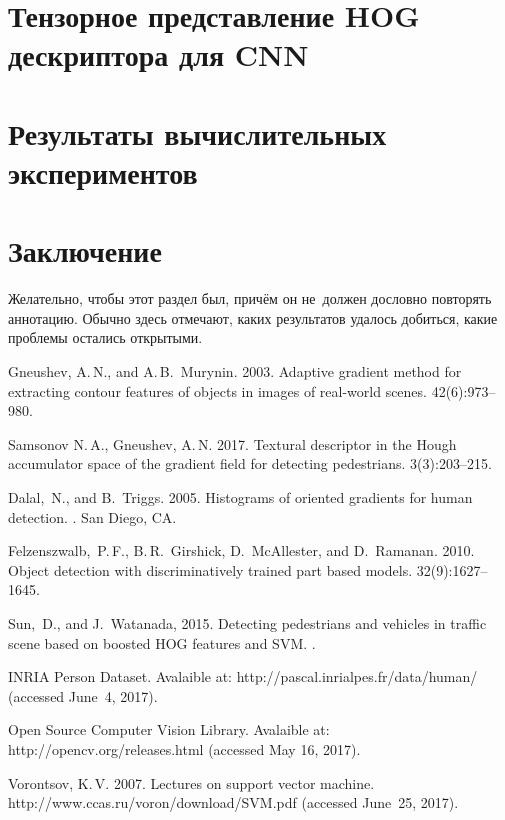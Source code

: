 \documentclass[12pt,twoside]{article}
\begin{document}
\section{Тензорное представление HOG дескриптора для CNN}


\section{Результаты вычислительных экспериментов}

\section{Заключение}
Желательно, чтобы этот раздел был, причём он не~должен дословно повторять аннотацию.
Обычно здесь отмечают,
каких результатов удалось добиться,
какие проблемы остались открытыми.

\bigskip
\maketitleSecondary




\begin{thebibliography}{99}
Gneushev, A.\,N., and A.\,B.~Murynin.	
2003. Adaptive gradient method for extracting contour features of
objects in images of real-world scenes.
 42(6):973--980.

Samsonov N.\,A., Gneushev, A.\,N.	
2017. Textural descriptor in the Hough accumulator space of the gradient field for detecting pedestrians.
 3(3):203--215.


Dalal,~N., and B.~Triggs. 2005.
 Histograms of oriented gradients for
human detection. . San Diego, CA.

	{Felzenszwalb,~P.\,F., B.\,R.~Girshick, D.~McAllester,
	and D.~Ramanan}. 2010.
	Object detection with discriminatively trained part based models.
 32(9):1627--1645.

	{Sun,~D., and J.~Watanada}, 2015.
	Detecting pedestrians and vehicles in traffic scene based on
	boosted HOG features and SVM.
.

	INRIA Person Dataset.
	Avalaible at: {\sf http://pascal.inrialpes.fr/data/human/}
	(accessed June~4, 2017).

	Open Source Computer Vision Library.
	Avalaible at: {\sf http://opencv.org/releases.html}
	(accessed May 16, 2017).
	
	Vorontsov, K.\,V. 2007. Lectures on support vector machine.
	{\sf http://www.ccas.ru/voron/download/\linebreak SVM.pdf}
	(accessed June~25, 2017).

\end{thebibliography}
\end{document}
